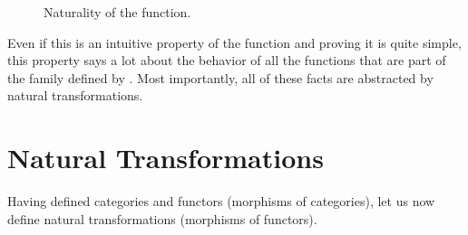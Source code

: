 \begin{figure}[htb]
  \begin{center}
  \end{center}
  \caption{Naturality of the  function.}
  \label{fig:naturality-head-haskell}
\end{figure}

Even if this is an intuitive property of the 
function and proving it is quite simple, this property says a lot
about the behavior of all the functions that are part of the family
defined by . Most importantly, all of these facts
are abstracted by natural transformations.

\section{Natural Transformations}
\label{sec:naturals}

Having defined categories and functors (morphisms of categories), let
us now define natural transformations (morphisms of functors).

